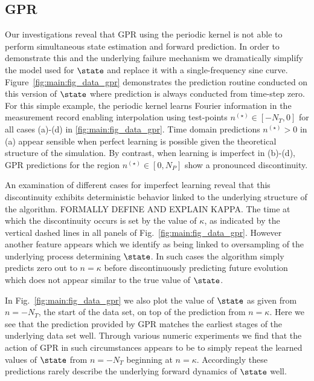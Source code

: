 \subsection{GPR} 
Our investigations reveal that GPR using the periodic kernel is not able to perform simultaneous state estimation and forward prediction.  In order to demonstrate this and the underlying failure mechanism we dramatically simplify the model used for $\state$ and replace it with a single-frequency sine curve.  Figure~\ref{fig:main:fig_data_gpr} demonstrates the prediction routine conducted on this version of $\state$ where prediction is always conducted from time-step zero.   For this simple example, the periodic kernel learns Fourier information in the measurement record enabling interpolation using test-points $n^{(\star)} \in [-N_T, 0]$ for all cases (a)-(d) in \cref{fig:main:fig_data_gpr}. Time domain predictions $n^{(\star)} >0$  in (a) appear sensible when perfect learning is possible given the theoretical structure of the simulation. By contrast, when learning is imperfect in (b)-(d), GPR predictions for the region  $n^{(\star)} \in [0, N_P]$ show a pronounced discontinuity.

An examination of different cases for imperfect learning reveal that this discontinuity exhibits deterministic behavior linked to the underlying structure of the algorithm.  FORMALLY DEFINE AND EXPLAIN KAPPA.  The time at which the discontinuity occurs is set by the value of $\kappa$, as indicated by the vertical dashed lines in all panels of Fig.~\ref{fig:main:fig_data_gpr}.  However another feature appears which we identify as being linked to oversampling of the underlying process determining $\state$.  In such cases the algorithm simply predicts zero out to $n=\kappa$ before discontinuously predicting future evolution which does not appear similar to the true value of $\state$.

In Fig.~\ref{fig:main:fig_data_gpr} we also plot the value of $\state$ as given from $n=-N_{T}$, the start of the data set, on top of the prediction from $n=\kappa$.  Here we see that the prediction provided by GPR matches the earliest stages of the underlying data set well.  Through various numeric experiments we find that the action of GPR in such circumstances appears to be to simply repeat the learned values of $\state$ from $n=-N_{T}$ beginning at $n=\kappa$.  Accordingly these predictions rarely describe the underlying forward dynamics of $\state$ well.




